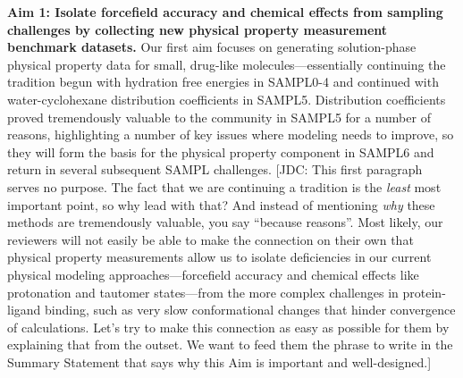 \documentclass[11pt]{article}
\begin{document}
{\bf Aim 1: Isolate forcefield accuracy and chemical effects from sampling challenges by collecting new physical property measurement benchmark datasets.} %
Our first aim focuses on generating solution-phase physical property data for small, drug-like molecules---essentially continuing the tradition begun with hydration free energies in SAMPL0-4 and continued with water-cyclohexane distribution coefficients in SAMPL5. 
Distribution coefficients proved tremendously valuable to the community in SAMPL5 for a number of reasons, highlighting a number of key issues where modeling needs to improve, so they will form the basis for the physical property component in SAMPL6 and return in several subsequent SAMPL challenges.
{\color{red}[JDC: This first paragraph serves no purpose. The fact that we are continuing a tradition is the \emph{least} most important point, so why lead with that? And instead of mentioning \emph{why} these methods are tremendously valuable, you say ``because reasons''. Most likely, our reviewers will not easily be able to make the connection on their own that physical property measurements allow us to isolate deficiencies in our current physical modeling approaches---forcefield accuracy and chemical effects like protonation and tautomer states---from the more complex challenges in protein-ligand binding, such as very slow conformational changes that hinder convergence of calculations. Let's try to make this connection as easy as possible for them by explaining that from the outset. We want to feed them the phrase to write in the Summary Statement that says why this Aim is important and well-designed.]}
\end{document}
